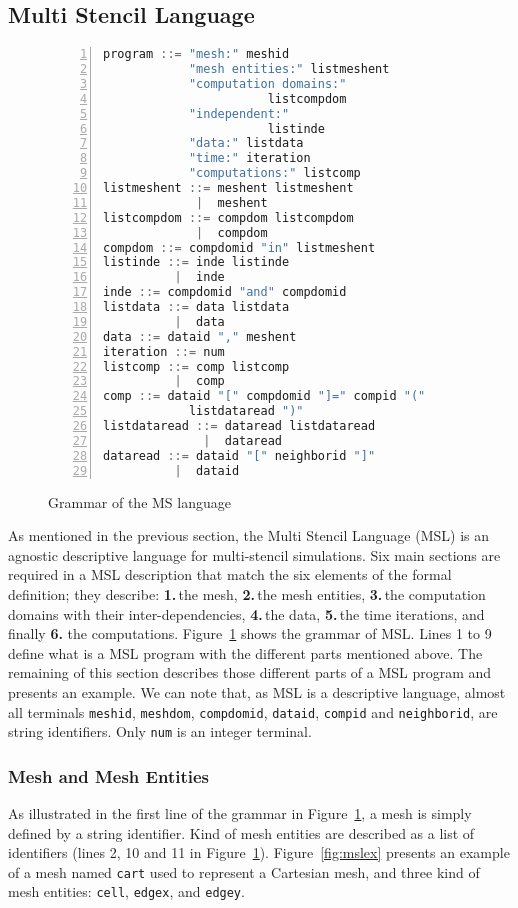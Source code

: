 \subsection{Multi Stencil Language}

\begin{figure}[t]
\begin{lstlisting}[basicstyle=\small,mathescape,frame=single,language=C++,numbers=left]
program ::= "mesh:" meshid 
            "mesh entities:" listmeshent
            "computation domains:" 
                       listcompdom
            "independent:"
                       listinde
            "data:" listdata
            "time:" iteration
            "computations:" listcomp
listmeshent ::= meshent listmeshent
             |  meshent
listcompdom ::= compdom listcompdom
             |  compdom
compdom ::= compdomid "in" listmeshent
listinde ::= inde listinde
          |  inde
inde ::= compdomid "and" compdomid
listdata ::= data listdata
          |  data
data ::= dataid "," meshent
iteration ::= num
listcomp ::= comp listcomp
          |  comp
comp ::= dataid "[" compdomid "]=" compid "(" 
            listdataread ")"
listdataread ::= dataread listdataread
              |  dataread
dataread ::= dataid "[" neighborid "]"
          |  dataid
\end{lstlisting}
\caption{Grammar of the MS language}
\label{fig:grammar}
\end{figure}

As mentioned in the previous section, the Multi Stencil Language (MSL) is an agnostic descriptive language for multi-stencil simulations. Six main sections are required in a MSL description that match the six elements of the formal definition; they describe: \textbf{1.}\,the mesh, \textbf{2.}\,the mesh entities, \textbf{3.}\,the computation domains with their inter-dependencies, \textbf{4.}\,the data, \textbf{5.}\,the time iterations, and finally \textbf{6.} the computations.
Figure~\ref{fig:grammar} shows the grammar of MSL. Lines 1 to 9 define what is a MSL program with the different parts mentioned above. The remaining of this section describes those different parts of a MSL program and presents an example.
We can note that, as MSL is a descriptive language, almost all terminals \texttt{meshid}, \texttt{meshdom}, \texttt{compdomid}, \texttt{dataid}, \texttt{compid} and \texttt{neighborid}, are string identifiers. Only \texttt{num} is an integer terminal.

\subsubsection*{Mesh and Mesh Entities}
As illustrated in the first line of the grammar in Figure~\ref{fig:grammar}, a mesh is simply defined by a string identifier.
Kind of mesh entities are described as a list of identifiers (lines 2, 10 and 11 in Figure~\ref{fig:grammar}).
Figure~\ref{fig:mslex} presents an example of a mesh named \texttt{cart} used to represent a Cartesian mesh, and three kind of mesh entities: \texttt{cell}, \texttt{edgex}, and \texttt{edgey}.

